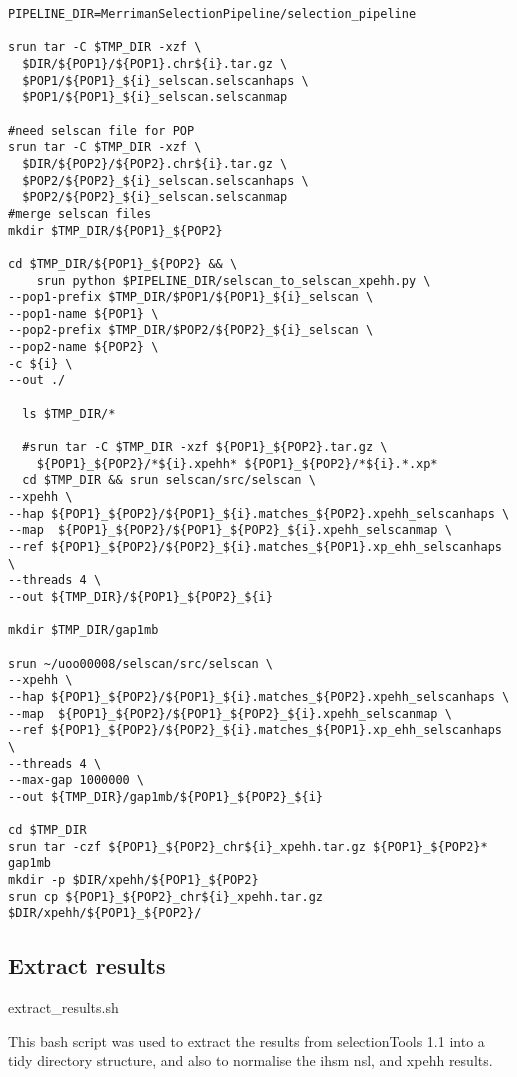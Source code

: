 \documentclass[twoside,openright]{report}
\begin{document}
\begin{appendices}
\begin{verbatim}
PIPELINE_DIR=MerrimanSelectionPipeline/selection_pipeline

srun tar -C $TMP_DIR -xzf \
  $DIR/${POP1}/${POP1}.chr${i}.tar.gz \
  $POP1/${POP1}_${i}_selscan.selscanhaps \
  $POP1/${POP1}_${i}_selscan.selscanmap

#need selscan file for POP
srun tar -C $TMP_DIR -xzf \
  $DIR/${POP2}/${POP2}.chr${i}.tar.gz \
  $POP2/${POP2}_${i}_selscan.selscanhaps \
  $POP2/${POP2}_${i}_selscan.selscanmap
#merge selscan files
mkdir $TMP_DIR/${POP1}_${POP2}

cd $TMP_DIR/${POP1}_${POP2} && \
    srun python $PIPELINE_DIR/selscan_to_selscan_xpehh.py \
--pop1-prefix $TMP_DIR/$POP1/${POP1}_${i}_selscan \
--pop1-name ${POP1} \
--pop2-prefix $TMP_DIR/$POP2/${POP2}_${i}_selscan \
--pop2-name ${POP2} \
-c ${i} \
--out ./
  
  ls $TMP_DIR/*
  
  #srun tar -C $TMP_DIR -xzf ${POP1}_${POP2}.tar.gz \
    ${POP1}_${POP2}/*${i}.xpehh* ${POP1}_${POP2}/*${i}.*.xp*
  cd $TMP_DIR && srun selscan/src/selscan \
--xpehh \
--hap ${POP1}_${POP2}/${POP1}_${i}.matches_${POP2}.xpehh_selscanhaps \
--map  ${POP1}_${POP2}/${POP1}_${POP2}_${i}.xpehh_selscanmap \
--ref ${POP1}_${POP2}/${POP2}_${i}.matches_${POP1}.xp_ehh_selscanhaps  \
--threads 4 \
--out ${TMP_DIR}/${POP1}_${POP2}_${i}

mkdir $TMP_DIR/gap1mb

srun ~/uoo00008/selscan/src/selscan \
--xpehh \
--hap ${POP1}_${POP2}/${POP1}_${i}.matches_${POP2}.xpehh_selscanhaps \
--map  ${POP1}_${POP2}/${POP1}_${POP2}_${i}.xpehh_selscanmap \
--ref ${POP1}_${POP2}/${POP2}_${i}.matches_${POP1}.xp_ehh_selscanhaps  \
--threads 4 \
--max-gap 1000000 \
--out ${TMP_DIR}/gap1mb/${POP1}_${POP2}_${i}

cd $TMP_DIR
srun tar -czf ${POP1}_${POP2}_chr${i}_xpehh.tar.gz ${POP1}_${POP2}* gap1mb
mkdir -p $DIR/xpehh/${POP1}_${POP2}
srun cp ${POP1}_${POP2}_chr${i}_xpehh.tar.gz $DIR/xpehh/${POP1}_${POP2}/
\end{verbatim}

\subsection{Extract results}\label{extract-results}

extract\_results.sh

This bash script was used to extract the results from selectionTools 1.1
into a tidy directory structure, and also to normalise the \gls{ihs}m
\gls{nsl}, and \gls{xpehh} results.


\end{appendices}
\end{document}

